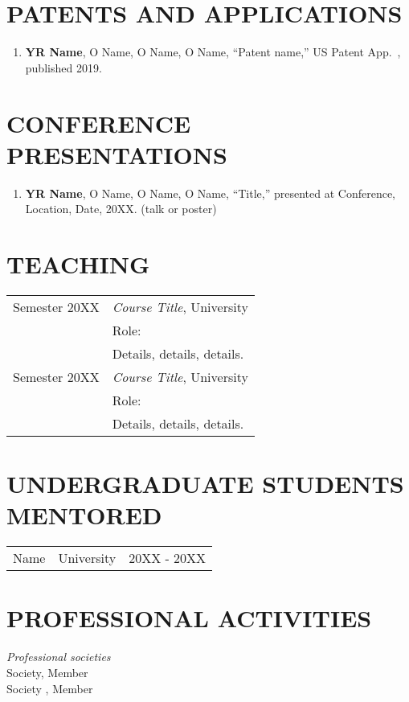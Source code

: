 \documentclass[line,10pt]{res}
\begin{document}
\begin{resume}
\section{\bf PATENTS AND APPLICATIONS}
\vspace{1em}\null
\begin{enumerate}
    \setlength\itemsep{0.8em}
    \item \textbf{YR Name}, O Name, O Name, O Name, ``Patent name,'' US Patent App.\ , published 2019.
\end{enumerate}


\section{\bf CONFERENCE PRESENTATIONS}
\vspace{1em}\null
\begin{enumerate}
    \setlength\itemsep{0.8em}
    \item \textbf{YR Name}, O Name, O Name, O Name,
``Title,''
presented at Conference, Location, Date, 20XX. (talk or poster)
\end{enumerate}


\section{\bf TEACHING}
\vspace{1em}
\begin{tabular}{p{1.2in} p{4.8in}}
Semester 20XX & \textit{Course Title}, University\\
 & Role: \\
 & Details, details, details.\\[0.5em]
 Semester 20XX & \textit{Course Title}, University\\
 & Role: \\
 & Details, details, details.
\end{tabular}

\section{\bf UNDERGRADUATE STUDENTS MENTORED}
\vspace{1em}
\begin{tabular}{p{1.5in} p{3.5in} p{1.0in}}
Name & University & 20XX - 20XX\\
\end{tabular}

\section{\bf PROFESSIONAL ACTIVITIES}
\vspace{1em}
{\it Professional societies}\\[0.5em]
Society, Member\\
Society , Member


\end{resume}
\end{document}

